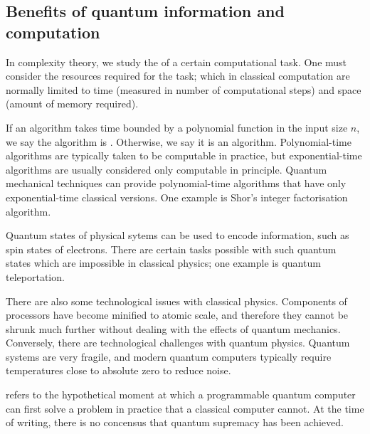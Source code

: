 \subsection{Benefits of quantum information and computation}
In complexity theory, we study the  of a certain computational task.
One must consider the resources required for the task; which in classical computation are normally limited to time (measured in number of computational steps) and space (amount of memory required).

If an algorithm takes time bounded by a polynomial function in the input size $n$, we say the algorithm is .
Otherwise, we say it is an  algorithm.
Polynomial-time algorithms are typically taken to be computable in practice, but exponential-time algorithms are usually considered only computable in principle.
Quantum mechanical techniques can provide polynomial-time algorithms that have only exponential-time classical versions.
One example is Shor's integer factorisation algorithm.

Quantum states of physical sytems can be used to encode information, such as spin states of electrons.
There are certain tasks possible with such quantum states which are impossible in classical physics; one example is quantum teleportation.

There are also some technological issues with classical physics.
Components of processors have become minified to atomic scale, and therefore they cannot be shrunk much further without dealing with the effects of quantum mechanics.
Conversely, there are technological challenges with quantum physics.
Quantum systems are very fragile, and modern quantum computers typically require temperatures close to absolute zero to reduce noise.

 refers to the hypothetical moment at which a programmable quantum computer can first solve a problem in practice that a classical computer cannot.
At the time of writing, there is no concensus that quantum supremacy has been achieved.

